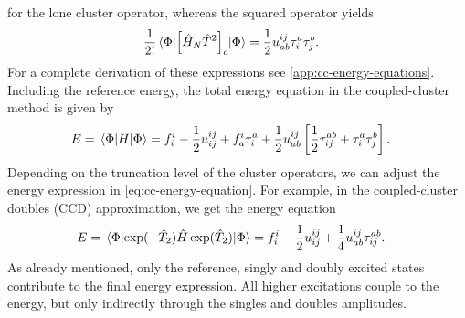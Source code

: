             for the lone cluster operator, whereas the squared operator yields
            \begin{align}
                \frac{1}{2!}\mel*{\Phi}{
                    \left[ 
                        \hat{H}_N \hat{T}^2
                     \right]_c
                }{\Phi}
                &=
                \frac{1}{2} u^{ij}_{ab}\tau^{a}_{i}\tau^{b}_{j}.
                \label{eq:cc-energy-squared-contrib}
            \end{align}
            For a complete derivation of these expressions see
            \autoref{app:cc-energy-equations}.
            Including the reference energy, the total energy equation in the
            coupled-cluster method is given by
            \begin{align}
                E
                &= \mel*{\Phi}{\bar{H}}{\Phi}
                =
                f^{i}_{i}
                - \frac{1}{2} u^{ij}_{ij}
                + f^{i}_{a}\tau^{a}_{i}
                + \frac{1}{2}u^{ij}_{ab}\left[ 
                    \frac{1}{2}\tau^{ab}_{ij}
                    + \tau^{a}_{i}\tau^{b}_{j}
                 \right].
                \label{eq:cc-energy-equation}
            \end{align}
            Depending on the truncation level of the cluster operators, we can
            adjust the energy expression in \autoref{eq:cc-energy-equation}.
            For example, in the coupled-cluster doubles (CCD) approximation, we
            get the energy equation
            \begin{align}
                \energy
                &= \mel*{\slat}{
                    \exponential(-\clust_2)
                    \hamil
                    \exponential(\clust_2)
                }{\slat}
                =
                \fockten^{i}_{i}
                - \half \twoten^{ij}_{ij}
                + \frac{1}{4}\twoten^{ij}_{ab} \clustamp^{ab}_{ij}.
                \label{eq:ccd-energy-equation}
            \end{align}
            As already mentioned, only the reference, singly and doubly excited
            states contribute to the final energy expression.
            All higher excitations couple to the energy, but only indirectly
            through the singles and doubles amplitudes.


